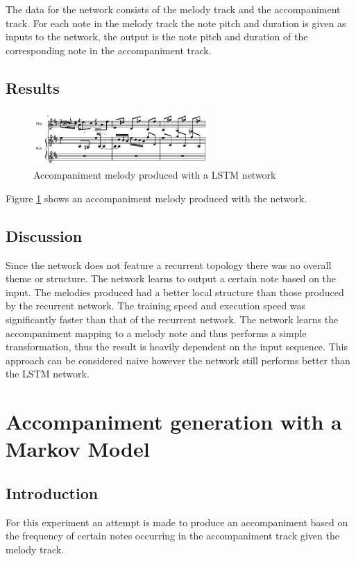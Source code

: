 The data for the network consists of the melody track and the accompaniment track. For each note in the melody track the note pitch and duration is given as inputs to the network, the output is the note pitch and duration of the corresponding note in the accompaniment track.

\section{Results}
\begin{figure}[h!]
\centerline{\includegraphics[width=250px]{../images/ann_ff_accomp.pdf}}
\caption{Accompaniment melody produced with a \ac{LSTM} network}
\label{ims:annffaccomp}
\end{figure}

Figure \ref{ims:annffaccomp} shows an accompaniment melody produced with the network.
\section{Discussion}
Since the network does not feature a recurrent topology there was no overall theme or structure. The network learns to output a certain note based on the input. The melodies produced had a better local structure than those produced by the recurrent network. The training speed and execution speed was significantly faster than that of the recurrent network. The network learns the accompaniment mapping to a melody note and thus performs a simple transformation, thus the result is heavily dependent on the input sequence. This approach can be considered naive however the network still performs better than the \ac{LSTM} network.

\chapter{Accompaniment generation with a Markov Model}
\section{Introduction}
For this experiment an attempt is made to produce an accompaniment based on the frequency of certain notes occurring in the accompaniment track given the melody track.

